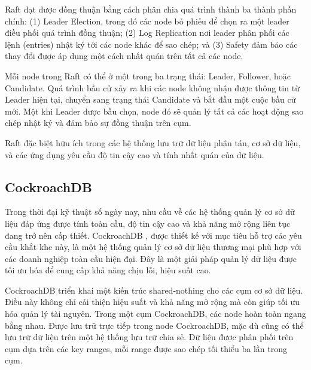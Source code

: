 \documentclass{extreport}[13.5pt, oneside,a4paper]
\begin{document}
Raft đạt được đồng thuận bằng cách phân chia quá trình thành ba thành phần chính: (1) Leader Election, trong đó các node bỏ phiếu để chọn ra một leader điều phối quá trình đồng thuận; (2) Log Replication nơi leader phân phối các lệnh (entries) nhật ký tới các node khác để sao chép; và (3) Safety đảm bảo các thay đổi được áp dụng một cách nhất quán trên tất cả các node.

Mỗi node trong Raft có thể ở một trong ba trạng thái: Leader, Follower, hoặc Candidate. Quá trình bầu cử xảy ra khi các node không nhận được thông tin từ Leader hiện tại, chuyển sang trạng thái Candidate và bắt đầu một cuộc bầu cử mới. Một khi Leader được bầu chọn, node đó sẽ quản lý tất cả các hoạt động sao chép nhật ký và đảm bảo sự đồng thuận trên cụm.

Raft đặc biệt hữu ích trong các hệ thống lưu trữ dữ liệu phân tán, cơ sở dữ liệu, và các ứng dụng yêu cầu độ tin cậy cao và tính nhất quán của dữ liệu.



\subsection{CockroachDB}

Trong thời đại kỹ thuật số ngày nay, nhu cầu về các hệ thống quản lý cơ sở dữ liệu đáp ứng được tính toàn cầu, độ tin cậy cao và khả năng mở rộng liên tục đang trở nên cấp thiết. CockroachDB \cite{taft2020cockroachdb}, được thiết kế với mục tiêu hỗ trợ các yêu cầu khắt khe này, là một hệ thống quản lý cơ sở dữ liệu thương mại phù hợp với các doanh nghiệp toàn cầu hiện đại. Đây là một giải pháp quản lý dữ liệu được tối ưu hóa để cung cấp khả năng chịu lỗi, hiệu suất cao.



CockroachDB triển khai một kiến trúc shared-nothing cho các cụm cơ sở dữ liệu. Điều này không chỉ cải thiện hiệu suất và khả năng mở rộng mà còn giúp tối ưu hóa quản lý tài nguyên. Trong một cụm CockroachDB, các node hoàn toàn ngang bằng nhau. Được lưu trữ trực tiếp trong node CockroachDB, mặc dù cũng có thể lưu trữ dữ liệu trên một hệ thống lưu trữ chia sẻ. Dữ liệu được phân phối trên cụm dựa trên các key ranges, mỗi range được sao chép tối thiểu ba lần trong cụm.
\end{document}
